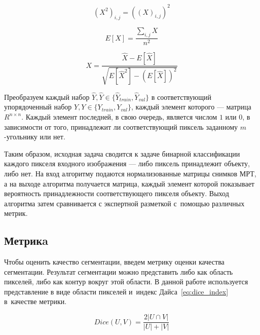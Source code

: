\begin{equation}
\label{eq:input_squared}
(X^{2})_{i,j}=((X)_{i,j})^{2}
\end{equation}

\begin{equation}
\label{eq:input_expected_value}
E[X]=\frac{
  \sum_{i,j}X
}{
  n^{2}
}
\end{equation} 

\begin{equation}
\label{eq:input_normalized}
X = \frac{
  \hat{X} - E[\hat{X}]
}{\sqrt{
  E[\hat{X}^{2}] - (E[\hat{X}])^2
}}
\end{equation}

Преобразуем каждый набор $\hat{Y},\hat{Y}\in{}\{\hat{Y}_{train},\hat{Y}_{val}\}$ в соответствующий упорядоченный набор $Y,Y\in{}\{Y_{train},Y_{val}\}$, каждый элемент которого — матрица $R^{n\times{}n}$. Каждый элемент последней, в свою очередь, является числом $1$ или $0$, в зависимости от того, принадлежит ли соответствующий пиксель заданному \mbox{$m$-угольнику} или нет.

Таким образом, исходная задача сводится к задаче бинарной классификации каждого пикселя входного изображения — либо пиксель принадлежит объекту, либо нет. На вход алгоритму подаются нормализованные матрицы снимков МРТ, а на выходе алгоритма получается матрица, каждый элемент которой показывает вероятность принадлежности соответствующего пикселя объекту. Выход алгоритма затем сравнивается с экспертной разметкой с~помощью различных метрик.

\subsection{Метрикa}

Чтобы оценить качество сегментации, введем метрику оценки качества сегментации. Результат сегментации можно представить либо как область пикселей, либо как контур вокруг этой области. В данной работе используется представление в виде области пикселей и~индекс Дайса~\eqref{eq:dice_index} в~качестве метрики. 

\begin{equation}
\label{eq:dice_index}
  Dice(U,V) = \frac{2|U\cap{}V|}{|U| + |V|}
\end{equation}
